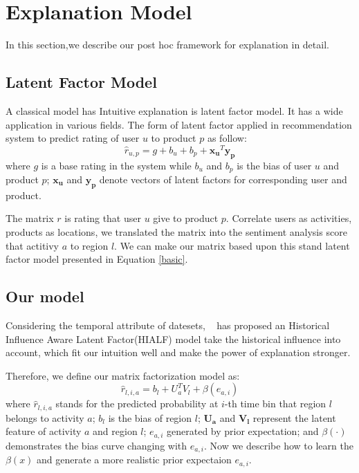 \documentclass[runningheads]{llncs}
\begin{document}
\section{Explanation Model}
In this section,we describe our post hoc framework for explanation in detail.

\subsection{Latent Factor Model}
A classical model has Intuitive explanation is latent factor model.
It has a wide application in various fields.
The form of latent factor applied in recommendation system to predict rating of user $u$ to product $p$ as follow:
\begin{equation}
\hat{r}_{u,p}= g+b_u+b_p+\bm{x_u}^T\bm{y_p} \label{basic}
\end{equation}
where $g$ is a base rating in the system while $b_u$ and $b_p$ is the bias of user $u$ and product $p$;
$\bm{x_u}$ and $\bm{y_p}$ denote vectors of latent factors for corresponding user and product.

The matrix $r$ is rating that user $u$ give to product $p$.
Correlate users as activities, products as locations, we translated the matrix into the sentiment analysis score that actitivy $a$ to region $l$.
We can make our matrix based upon this stand latent factor model presented in Equation \ref{basic}.

\subsection{Our model}
Considering the temporal attribute of datesets, ~\cite{Zhang2017Model} has proposed an Historical Influence Aware Latent Factor(HIALF) model take the historical influence into account, which fit our intuition well and make the power of explanation stronger.

Therefore, we define our matrix factorization model as:
\begin{equation}
\hat{r}_{l,i,a}=b_l+U_a^TV_l+\beta(e_{a,i})\label{model}
\end{equation}
where $\hat{r}_{l,i,a}$ stands for the predicted probability at $i$-th time bin that region $l$ belongs to activity $a$;
$b_l$ is the bias of region $l$;
$\bm{U_a}$ and $\bm{V_l}$ represent the latent feature of activity $a$ and region $l$;
$e_{a,i}$ generated by prior expectation;
and $\beta(\cdot)$ demonstrates the bias curve changing with $e_{a,i}$.
Now we describe how to learn the $\beta(x)$ and generate a more realistic prior expectaion $e_{a,i}$.
\end{document}
